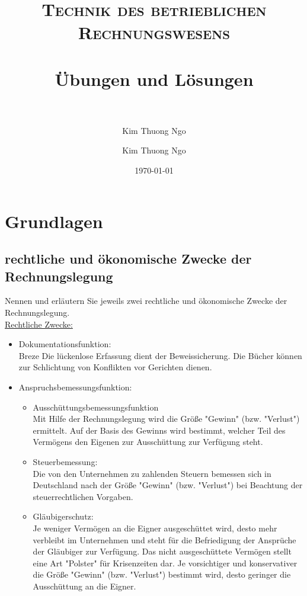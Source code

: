 \documentclass[paper=a4, fontsize=11pt]{scrartcl}
\author{Kim Thuong Ngo}
\title{
\normalfont \normalsize
\textsc{Technik des betrieblichen Rechnungswesens} \\ [25pt]
\horrule{0.5pt} \\[0.4cm]
\huge Übungen und Lösungen\\
\horrule{2pt} \\[0.5cm]
}
\author{Kim Thuong Ngo}
\date{\normalsize\today}
\numberwithin{equation}{section}
\numberwithin{figure}{section}
\numberwithin{table}{section}
\begin{document}
\maketitle

\newpage

\tableofcontents

\newpage


\section{Grundlagen}


\subsection{rechtliche und ökonomische Zwecke der Rechnungslegung}

Nennen und erläutern Sie jeweils zwei rechtliche und ökonomische Zwecke der Rechnungslegung. \\

\underline{Rechtliche Zwecke:}

\begin{itemize}
\item Dokumentationsfunktion: \\
Breze
Die lückenlose Erfassung dient der Beweissicherung. Die Bücher können zur Schlichtung von Konflikten vor Gerichten dienen.

\item Anspruchsbemessungsfunktion:
  \begin{itemize}
  \item Ausschüttungsbemessungsfunktion \\
Mit Hilfe der Rechnungslegung wird die Größe "Gewinn" (bzw. "Verlust") ermittelt. Auf  der Basis des Gewinns wird bestimmt, welcher Teil des Vermögens den Eigenen zur Ausschüttung zur Verfügung steht.
  \item Steuerbemessung: \\
Die von den Unternehmen zu zahlenden Steuern bemessen sich in Deutschland nach der Größe "Gewinn" (bzw. "Verlust") bei Beachtung der steuerrechtlichen Vorgaben.
  \item Gläubigerschutz: \\
Je weniger Vermögen an die Eigner ausgeschüttet wird, desto mehr verbleibt im Unternehmen und steht für die Befriedigung der Ansprüche der Gläubiger zur Verfügung. Das nicht ausgeschüttete Vermögen stellt eine Art "Polster" für Krisenzeiten dar. Je vorsichtiger und konservativer die Größe "Gewinn" (bzw. "Verlust") bestimmt wird, desto geringer die Ausschüttung an die Eigner.
\end{itemize}
\end{itemize}
\end{document}
